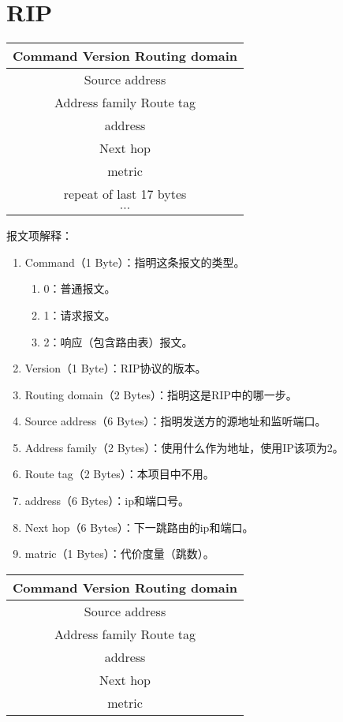 \documentclass[15pt]{ctexart}
\begin{document}

\tableofcontents
\newpage
\section{RIP} %
\label{sec:rip}

\begin{table}[H]
	\centering
	\begin{tabular}{|c|}
		\hline
		Command \; \vline \; Version \; \vline \; Routing domain \; \\
		\hline
		Source address \\
		\hline
		Address family \; \vline \; Route tag \; \\
		\hline
		address \\
		\hline
		Next hop \\
		\hline
		metric \\
		\hline
		repeat of last 17 bytes \\
		\hline
		$\cdots$ \\
		\hline 
	\end{tabular}	
\end{table}
报文项解释：
\begin{enumerate}
	\item Command（1 Byte）：指明这条报文的类型。
	\begin{enumerate}[]
		\item 0：普通报文。
		\item 1：请求报文。
		\item 2：响应（包含路由表）报文。
	\end{enumerate}
	\item Version（1 Byte）：RIP协议的版本。
	\item Routing domain（2 Bytes）：指明这是RIP中的哪一步。
	\item Source address（6 Bytes）：指明发送方的源地址和监听端口。
	\item Address family（2 Bytes）：使用什么作为地址，使用IP该项为2。
	\item Route tag（2 Bytes）：本项目中不用。
	\item address（6 Bytes）：ip和端口号。
	\item Next hop（6 Bytes）：下一跳路由的ip和端口。
	\item matric（1 Bytes）：代价度量（跳数）。
\end{enumerate}
\begin{table}[H]
	\centering
	\begin{tabular}{|c|}
		\hline
		Command \; \vline \; Version \; \vline \; Routing domain \; \\
		\hline
		Source address \\
		\hline
		Address family \; \vline \; Route tag \; \\
		\hline
		address \\
		\hline
		Next hop \\
		\hline
		metric \\
		\hline
	\end{tabular}
\end{table}
\end{document}
